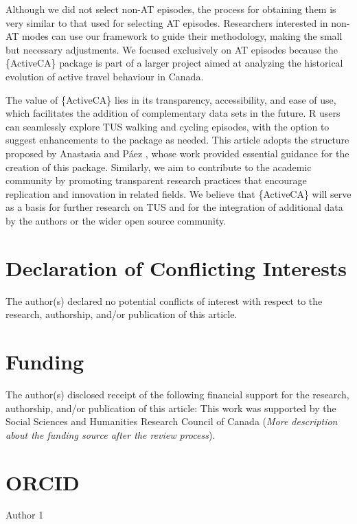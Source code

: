 \documentclass[Royal,times,sageh]{sagej}
\begin{document}
Although we did not select non-AT episodes, the process for obtaining
them is very similar to that used for selecting AT episodes. Researchers
interested in non-AT modes can use our framework to guide their
methodology, making the small but necessary adjustments. We focused
exclusively on AT episodes because the \{ActiveCA\} package is part of a
larger project aimed at analyzing the historical evolution of active
travel behaviour in Canada.

The value of \{ActiveCA\} lies in its transparency, accessibility, and
ease of use, which facilitates the addition of complementary data sets
in the future. R users can seamlessly explore TUS walking and cycling
episodes, with the option to suggest enhancements to the package as
needed. This article adopts the structure proposed by Anastasia and Páez
\citeyearpar{soukhov2023}, whose work provided essential guidance for
the creation of this package. Similarly, we aim to contribute to the
academic community by promoting transparent research practices that
encourage replication and innovation in related fields. We believe that
\{ActiveCA\} will serve as a basis for further research on TUS and for
the integration of additional data by the authors or the wider open
source community.

\section{Declaration of Conflicting
Interests}\label{declaration-of-conflicting-interests}

The author(s) declared no potential conflicts of interest with respect
to the research, authorship, and/or publication of this article.

\section{Funding}\label{funding}

The author(s) disclosed receipt of the following financial support for
the research, authorship, and/or publication of this article: This work
was supported by the Social Sciences and Humanities Research Council of
Canada (\emph{More description about the funding source after the review
process}).

\section{ORCID}\label{orcid}

Author 1
\end{document}
